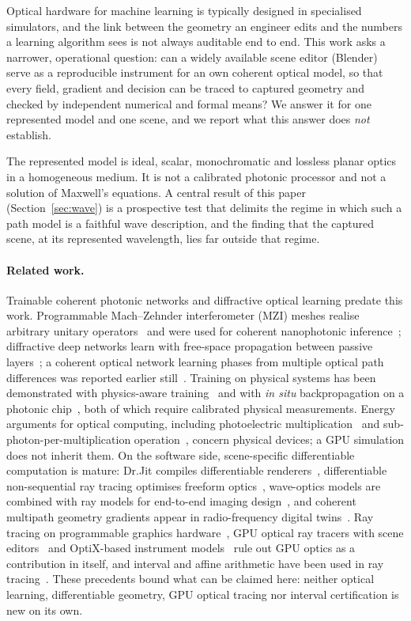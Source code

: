 \documentclass[11pt,a4paper]{article}
\begin{document}
Optical hardware for machine learning is typically designed in specialised simulators, and the link between the geometry an engineer edits and the numbers a learning algorithm sees is not always auditable end to end. This work asks a narrower, operational question: can a widely available scene editor (Blender) serve as a reproducible instrument for an own coherent optical model, so that every field, gradient and decision can be traced to captured geometry and checked by independent numerical and formal means? We answer it for one represented model and one scene, and we report what this answer does \emph{not} establish.

The represented model is ideal, scalar, monochromatic and lossless planar optics in a homogeneous medium. It is not a calibrated photonic processor and not a solution of Maxwell's equations. A central result of this paper (Section~\ref{sec:wave}) is a prospective test that delimits the regime in which such a path model is a faithful wave description, and the finding that the captured scene, at its represented wavelength, lies far outside that regime.

\paragraph{Related work.}
Trainable coherent photonic networks and diffractive optical learning predate this work. Programmable Mach--Zehnder interferometer (MZI) meshes realise arbitrary unitary operators~\cite{reck1994,clements2016} and were used for coherent nanophotonic inference~\cite{shen2017}; diffractive deep networks learn with free-space propagation between passive layers~\cite{lin2018}; a coherent optical network learning phases from multiple optical path differences was reported earlier still~\cite{kawata2003}. Training on physical systems has been demonstrated with physics-aware training~\cite{wright2022} and with \emph{in situ} backpropagation on a photonic chip~\cite{pai2023}, both of which require calibrated physical measurements. Energy arguments for optical computing, including photoelectric multiplication~\cite{hamerly2019} and sub-photon-per-multiplication operation~\cite{wang2022}, concern physical devices; a GPU simulation does not inherit them. On the software side, scene-specific differentiable computation is mature: Dr.Jit compiles differentiable renderers~\cite{jakob2022}, differentiable non-sequential ray tracing optimises freeform optics~\cite{dekoning2023}, wave-optics models are combined with ray models for end-to-end imaging design~\cite{ho2024}, and coherent multipath geometry gradients appear in radio-frequency digital twins~\cite{chen2026}. Ray tracing on programmable graphics hardware~\cite{purcell2002}, GPU optical ray tracers with scene editors~\cite{mauch2013} and OptiX-based instrument models~\cite{keksel2023} rule out GPU optics as a contribution in itself, and interval and affine arithmetic have been used in ray tracing~\cite{knoll2009,moore2009}. These precedents bound what can be claimed here: neither optical learning, differentiable geometry, GPU optical tracing nor interval certification is new on its own.
\end{document}
